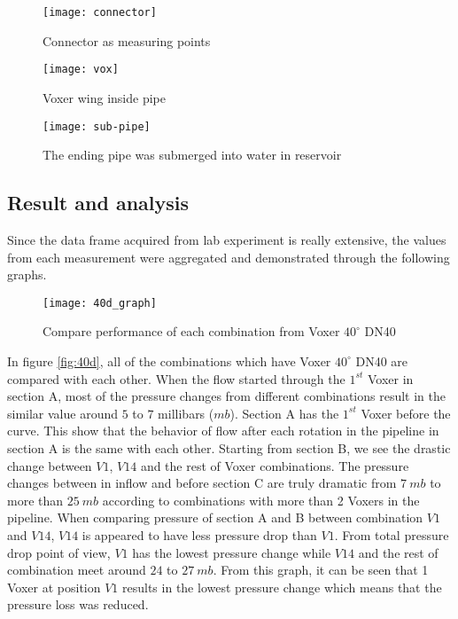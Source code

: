 \begin{figure}[!htb]
   \begin{minipage}{0.48\textwidth}
     \centering
     \texttt{[image: connector]}
     \caption{Connector as measuring points}\label{fig:connector}
   \end{minipage}\hfill
   \begin {minipage}{0.48\textwidth}
     \centering
     \texttt{[image: vox]}
     \caption{Voxer wing inside pipe}\label{fig:vox}
   \end{minipage}
\end{figure}


\begin{figure}[h]
  \centering
  \texttt{[image: sub-pipe]}
  \caption{ The ending pipe was submerged into water in reservoir}
  \label{fig:subpipe}
\end{figure}
\newpage

\subsection{Result and analysis}

Since the data frame acquired from lab experiment is really extensive, the values from each measurement were aggregated and demonstrated through the following graphs.

\begin{figure}[h!]
  \centering
  \texttt{[image: 40d\_graph]}
  \caption{ Compare performance of each combination from Voxer $40^{\circ}$ DN40}
  \label{fig:40d}
\end{figure}

In figure \vref{fig:40d}, all of the combinations which have Voxer $40^{\circ}$ DN40 are compared with each other. When the flow started through the $1^{st}$ Voxer in section A, most of the pressure changes from different combinations result in the similar value around $5$ to $7$ millibars ($mb$). Section A has the $1^{st}$ Voxer before the curve. This show that the behavior of flow after each rotation in the pipeline in section A is the same with each other. Starting from section B, we see the drastic change between $V1$, $V14$ and the rest of Voxer combinations. The pressure changes between in inflow and before section C are truly dramatic from $7\ mb$ to more than $25\ mb$ according to combinations with more than 2 Voxers in the pipeline. When comparing pressure of section A and B between combination $V1$ and $V14$, $V14$ is appeared to have less pressure drop than $V1$. From total pressure drop point of view, $V1$ has the lowest pressure change while $V14$ and the rest of combination meet around $24$ to $27\ mb$. From this graph, it can be seen that 1 Voxer at position $V1$ results in the lowest pressure change which means that the pressure loss was reduced. 
\newpage

